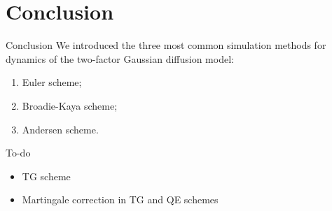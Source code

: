 \documentclass{vegapresentation}
\begin{document}
    \section*{Conclusion}
        \begin{frame}{Conclusion}
            We introduced the three most common simulation methods for dynamics of the two-factor Gaussian diffusion model:
            \begin{enumerate}
                \item Euler scheme; 
                \item Broadie-Kaya scheme;
                \item Andersen scheme.
            \end{enumerate}
        \end{frame}
        \begin{frame}{To-do}
            \begin{itemize}
                \item TG scheme
                \item Martingale correction in TG and QE schemes
            \end{itemize}
        \end{frame}
\end{document}
